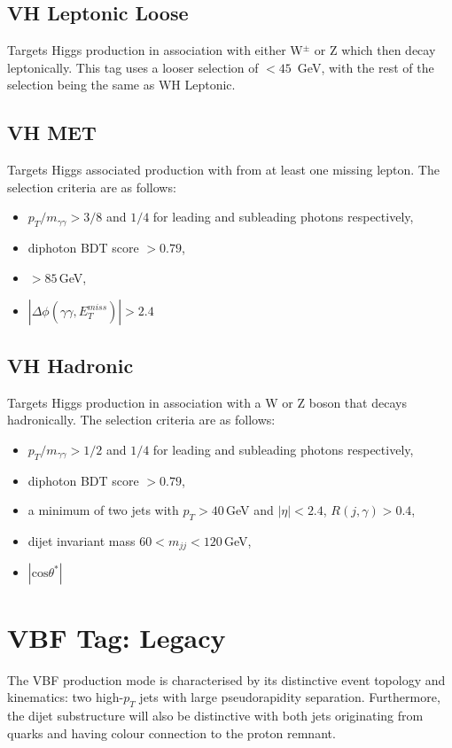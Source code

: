 \subsection{VH Leptonic Loose}
Targets Higgs production in association with either W$^{\pm}$ or Z which then decay leptonically. This tag uses a looser \MET selection of \MET$ < 45$\, GeV, with the rest of the selection being the same as WH Leptonic.

\subsection{VH MET}
Targets Higgs associated production with \MET from at least one missing lepton. The selection criteria are as follows:
\begin{itemize}[leftmargin=.5in,noitemsep]
    \item $p_{T}/m_{\gamma\gamma} > 3/8$ and $1/4$ for leading and subleading photons respectively,
    \item diphoton BDT score $> 0.79$,
    \item \MET$> 85$\,GeV,
    \item $|\Delta\phi(\gamma\gamma,E_{T}^{miss})| > 2.4$
\end{itemize}


\subsection{VH Hadronic}
Targets Higgs production in association with a W or Z boson that decays hadronically. The selection criteria are as follows:
\begin{itemize}[leftmargin=.5in,noitemsep]
    \item $p_{T}/m_{\gamma\gamma} > 1/2$ and $1/4$ for leading and subleading photons respectively, 
    \item diphoton BDT score $> 0.79$,
    \item a minimum of two jets with $p_T > 40$\,GeV and $|\eta| < 2.4$, $R(j,\gamma) > 0.4$,
    \item dijet invariant mass $60 < m_{jj} < 120$\,GeV,
    \item $|\mathrm{cos}{\theta^{*}}|$
\end{itemize}









\section{VBF Tag: Legacy}
The VBF production mode is characterised by its distinctive event topology and kinematics: two high-$p_{T}$ jets with large pseudorapidity separation. Furthermore, the dijet substructure will also be distinctive with both jets originating from quarks and having colour connection to the proton remnant. 

